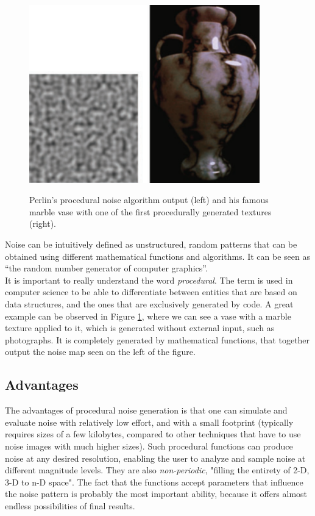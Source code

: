\begin{figure}[htp]
    \centering
    \includegraphics[width = 10cm]{figures/perlinMarbleVase.PNG}
    \caption{Perlin's procedural noise algorithm output (left) and his famous marble vase with one of the first procedurally generated textures (right).}
    \cite{perlin1985image}
    \label{fig:perlinMarbleVase}
\end{figure}

Noise can be intuitively defined as unstructured, random patterns that can be obtained using different mathematical functions and algorithms. It can be seen as “the random number generator of computer graphics”\cite{lagae2010survey}.\\

It is important to really understand the word \textit{procedural}. The term is used in computer science to be able to differentiate between entities that are based on data structures, and the ones that are exclusively generated by code\cite{lagae2010survey}. A great example can be observed in Figure \ref{fig:perlinMarbleVase}, where we can see a vase with a marble texture applied to it, which is generated without external input, such as photographs. It is completely generated by mathematical functions, that together output the noise map seen on the left of the figure.

\subsection{Advantages}

The advantages of procedural noise generation is that one can simulate and evaluate noise with relatively low effort, and with a small footprint (typically requires sizes of a few kilobytes, compared to other techniques that have to use noise images with much higher sizes). Such procedural functions can produce noise at any desired resolution, enabling the user to analyze and sample noise at different magnitude levels. They are also \textit{non-periodic}, "filling the entirety of 2-D, 3-D to n-D space". The fact that the functions accept parameters that influence the noise pattern is probably the most important ability, because it offers almost endless possibilities of final results\cite{lagae2010survey}.

